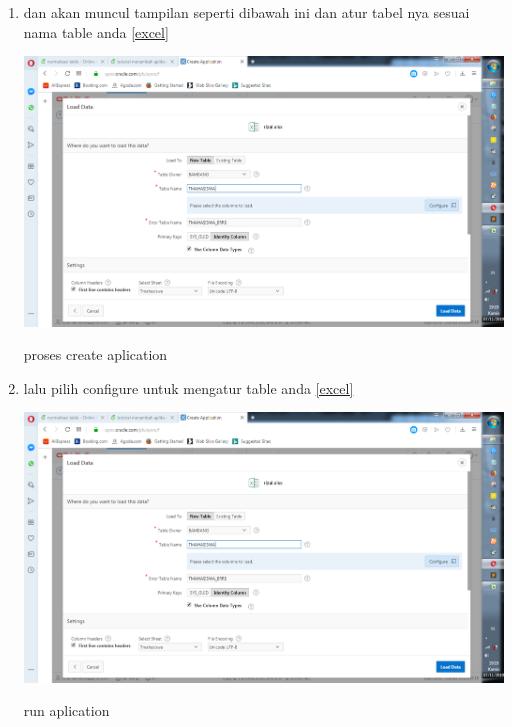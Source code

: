 \documentclass{article}
\begin{document}
\begin{enumerate}
     \item dan akan muncul tampilan seperti dibawah ini dan atur tabel nya sesuai nama table anda
      \ref{excel}
    \begin{center}
         \centering
            \includegraphics[scale=0.27]{gambar/10.png}
        \caption{proses create aplication}
        \label{excel}
    \end{center}
    
     \item lalu pilih configure untuk mengatur table anda
      \ref{excel}
    \begin{center}
         \centering
            \includegraphics[scale=0.27]{gambar/10.png}
        \caption{run aplication}
        \label{excel}
    \end{center}
    

\end{enumerate}
\end{document}
